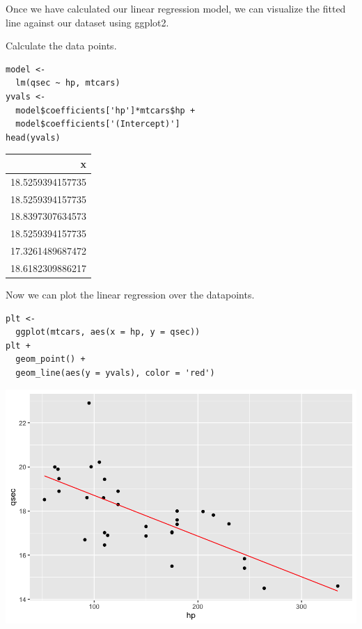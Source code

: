 \documentclass[11pt]{article}
\begin{document}
Once we have calculated our linear regression model, we can visualize the fitted line against our dataset using ggplot2.

Calculate the data points.

\begin{verbatim}
model <-
  lm(qsec ~ hp, mtcars)
yvals <-
  model$coefficients['hp']*mtcars$hp +
  model$coefficients['(Intercept)']
head(yvals)
\end{verbatim}

\begin{org}
\begin{center}
\begin{tabular}{r}
x\\
\hline
18.5259394157735\\
18.5259394157735\\
18.8397307634573\\
18.5259394157735\\
17.3261489687472\\
18.6182309886217\\
\end{tabular}
\end{center}
\end{org}

Now we can plot the linear regression over the datapoints.

\begin{verbatim}
plt <-
  ggplot(mtcars, aes(x = hp, y = qsec))
plt +
  geom_point() +
  geom_line(aes(y = yvals), color = 'red')
\end{verbatim}

\begin{org}
\begin{center}
\includegraphics[width=.9\linewidth]{./resources/mtcars_linreg1.png}
\end{center}
\end{org}
\end{document}
